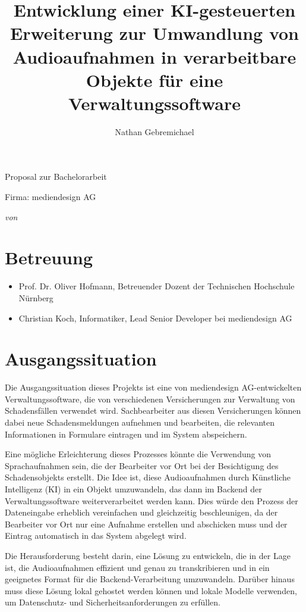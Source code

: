 \documentclass[12pt,a4paper,parskip=full]{scrartcl}
\title{Entwicklung einer KI-gesteuerten Erweiterung zur Umwandlung von Audioaufnahmen in verarbeitbare Objekte für eine Verwaltungssoftware}
\author{Nathan Gebremichael}
\date{}
\newcommand{\firma}{mediendesign AG}
\begin{document}
\makeatletter

{
    \centering
    {\Large Proposal zur Bachelorarbeit \par}
    \vspace*{1cm}
    {\LARGE \@title \par}
    \vspace*{1cm}
    {\large Firma: \firma \par}
    \vspace*{0.5cm}
    {\textit{\small von \@author} \par}
    }

\section*{Betreuung}
\begin{itemize}
    \item Prof. Dr. Oliver Hofmann, Betreuender Dozent der Technischen Hochschule Nürnberg
    \item Christian Koch, Informatiker, Lead Senior Developer bei mediendesign AG
\end{itemize}

\section*{Ausgangssituation}
Die Ausgangssituation dieses Projekts ist eine von mediendesign AG-entwickelten Verwaltungssoftware, die von verschiedenen Versicherungen zur Verwaltung von Schadensfällen verwendet wird.
Sachbearbeiter aus diesen Versicherungen können dabei neue Schadensmeldungen aufnehmen und bearbeiten, die relevanten Informationen in Formulare eintragen und im System abspeichern.

Eine mögliche Erleichterung dieses Prozesses könnte die Verwendung von Sprachaufnahmen sein, die der Bearbeiter vor Ort bei der Besichtigung des Schadensobjekts erstellt.
Die Idee ist, diese Audioaufnahmen durch Künstliche Intelligenz (KI) in ein Objekt umzuwandeln, das dann im Backend der Verwaltungssoftware weiterverarbeitet werden kann.
Dies würde den Prozess der Dateneingabe erheblich vereinfachen und gleichzeitig beschleunigen, da der Bearbeiter vor Ort nur eine Aufnahme erstellen und abschicken muss und der Eintrag automatisch in das System abgelegt wird.

Die Herausforderung besteht darin, eine Lösung zu entwickeln, die in der Lage ist, die Audioaufnahmen effizient und genau zu transkribieren und in ein geeignetes Format für die Backend-Verarbeitung umzuwandeln.
Darüber hinaus muss diese Lösung lokal gehostet werden können und lokale Modelle verwenden, um Datenschutz- und Sicherheitsanforderungen zu erfüllen.
\end{document}
